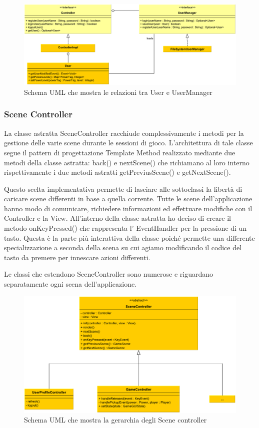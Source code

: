 \documentclass[a4paper,12pt]{report}
\begin{document}
\begin{figure}[H]
\includegraphics[width=\linewidth]{img/user}
\caption{Schema UML che mostra le relazioni tra User e UserManager}
\label{img:user}
\end{figure}

\subsubsection*{Scene Controller}
La classe astratta SceneController racchiude complessivamente i metodi per la gestione delle varie scene durante le sessioni di gioco.
L'architettura di tale classe segue il pattern di progettazione Template Method realizzato mediante due metodi della classe astratta: back() e nextScene() che richiamano al loro interno rispettivamente i due metodi astratti getPreviusScene() e getNextScene().

Questo scelta implementativa permette di lasciare alle sottoclassi la libertà di caricare scene differenti in base a quella corrente.
Tutte le scene dell'applicazione hanno modo di comunicare, richiedere informazioni ed effettuare modifiche con il Controller e la View.
All'interno della classe astratta ho deciso di creare il metodo onKeyPressed() che rappresenta l' EventHandler per la pressione di un tasto.
Questa è la parte più interattiva della classe poiché permette una differente specializzazione a seconda della scena su cui agiamo modificando il codice del tasto da premere per innescare azioni differenti.

Le classi che estendono SceneController sono numerose e riguardano separatamente ogni scena dell'applicazione.

\begin{figure}[H]
\includegraphics[width=\linewidth]{img/scene_controller}
\caption{Schema UML che mostra la gerarchia degli Scene controller}
\label{img:scenecontroller}
\end{figure}
\end{document}
